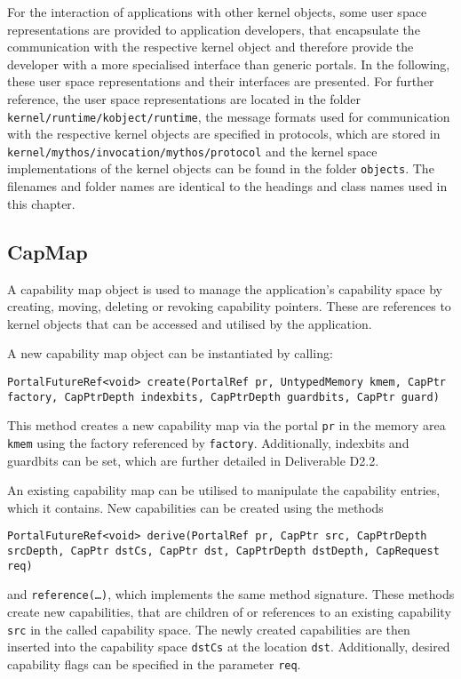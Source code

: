 For the interaction of applications with other kernel objects, some user space
representations are provided to application developers, that encapsulate the
communication with the respective kernel object and therefore provide the
developer with a more specialised interface than generic portals. In the
following, these user space representations and their interfaces are presented.
For further reference, the user space representations are located in the folder
\texttt{kernel/runtime/kobject/runtime}, the message formats used for communication
with the respective kernel objects are specified in protocols, which are stored
in \texttt{kernel/mythos/invocation/mythos/protocol} and the kernel space
implementations of the kernel objects can be found in the folder
\texttt{objects}. The filenames and folder names are identical to the headings and class names used in this chapter.

\subsection{CapMap}

A capability map object is used to manage the application's capability space by
creating, moving, deleting or revoking capability pointers. These are references
to kernel objects that can be accessed and utilised by the application.

A new capability map object can be instantiated by calling:
\lstset{language=c++,numbers=none}
\begin{lstlisting}
PortalFutureRef<void> create(PortalRef pr, UntypedMemory kmem, CapPtr factory, CapPtrDepth indexbits, CapPtrDepth guardbits, CapPtr guard)
\end{lstlisting}

\noindent This method creates a new capability map via the portal \texttt{pr} in the
memory area \texttt{kmem} using the factory referenced by \texttt{factory}.
Additionally, indexbits and guardbits can be set, which are further detailed in
Deliverable D2.2.

An existing capability map can be utilised to manipulate the capability entries,
which it contains. New capabilities can be created using the methods
\lstset{language=c++,numbers=none}
\begin{lstlisting}
PortalFutureRef<void> derive(PortalRef pr, CapPtr src, CapPtrDepth srcDepth, CapPtr dstCs, CapPtr dst, CapPtrDepth dstDepth, CapRequest req)
\end{lstlisting}

\noindent and \texttt{reference(\ldots)}, which implements the same method
signature.  These methods create new capabilities, that are children of or
references to an existing capability \texttt{src} in the called capability
space. The newly created capabilities are then inserted into the capability
space \texttt{dstCs} at the location \texttt{dst}. Additionally, desired
capability flags can be specified in the parameter \texttt{req}.

